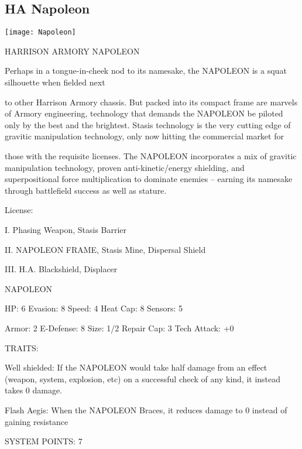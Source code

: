 \subsection{HA Napoleon}

\begin{center}
    \texttt{[image: Napoleon]}
\end{center}

                             HARRISON ARMORY NAPOLEON

Perhaps in a tongue-in-cheek nod to its namesake, the NAPOLEON is a squat silhouette when fielded next

to other Harrison Armory chassis. But packed into its compact frame are marvels of Armory engineering,
technology that demands the NAPOLEON be piloted only by the best and the brightest. Stasis technology
is the very cutting edge of gravitic manipulation technology, only now hitting the commercial market for

those with the requisite licenses. The NAPOLEON incorporates a mix of gravitic manipulation technology,
proven anti-kinetic/energy shielding, and superpositional force multiplication to dominate enemies --
earning its namesake through battlefield success as well as stature.

                                                  License:

I. Phasing Weapon, Stasis Barrier

II. NAPOLEON FRAME, Stasis Mine, Dispersal Shield

III. H.A. Blackshield, Displacer


                                               NAPOLEON

 HP: 6          Evasion: 8                           Speed: 4           Heat Cap: 8       Sensors:  5

 Armor: 2       E-Defense: 8                         Size: 1/2          Repair Cap: 3     Tech Attack:
                                                                                          +0

                                                  TRAITS:

 Well shielded: If the NAPOLEON would take half damage from an effect (weapon, system, explosion,
 etc) on a successful check of any kind, it instead takes 0 damage.

 Flash Aegis: When the NAPOLEON Braces, it reduces damage to 0 instead of gaining resistance

                                            SYSTEM POINTS: 7

